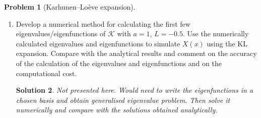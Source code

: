 \documentclass[11pt,a4paper]{article}
\theoremstyle{definition}
\newtheorem{problem}{Problem}
\theoremstyle{plain}
\newtheorem*{solution}{Solution}
\begin{document}
\begin{problem}[Karhunen--Loève expansion]
\begin{enumerate}
\begin{solution}
It can be shown that equation~\eqref{eq:final} with boundary conditions \eqref{bc-1}--\eqref{bc-2} only has solutions when $\omega^2\geq 0$ and that these are of the form
\[
\Phi(x) = c_1\cos(\omega x) + c_2\sin(\omega x).
\]
In order to compute the eigenvalues, we use the boundary conditions and obtain
\begin{align*}
c_1( a - \omega\tan(\omega L)) + c_2(\omega +  a\tan(\omega L)) &= 0, \\
c_1( a - \omega\tan(\omega L)) - c_2(\omega +  a\tan(\omega L)) &= 0.
\end{align*}
This system has nontrivial solutions only if its determinant is zero, which gives the following:
\begin{align*}
( a - \omega\tan(\omega L))  &= 0, \\
(\omega +  a\tan(\omega L)) &= 0.
\end{align*}
Denoting the solutions to these equations by $\omega, \, \omega^*$, we obtain the eigenvalues and eigenfunctions:
\begin{align}
\Phi_n(x) = \frac{\cos(\omega_n x)}{\sqrt{L+\frac{\sin(2\omega_n L)}{2\omega_n}}}, & \qquad\qquad \lambda_n = \frac{2a}{\omega_n^2+a^2}, & n \text{ even},\\
\Phi_n^*(x) = \frac{\sin(\omega_n^* x)}{\sqrt{L-\frac{\sin(2\omega_n^* L)}{2\omega_n^*}}}, & \qquad\qquad \lambda_n^* = \frac{2a}{{\omega_n^*}^2+a^2}, & n \text{ odd}.\\
\end{align}
And we can write
\[
X(t,\omega) = \sum_{n=1}^\infty \left[\xi_n\sqrt{\lambda_n}\Phi_n(x) + \xi_n^*\sqrt{\lambda_n^*}\Phi_n^*(x)\right],
\]
where $\xi_n, \, \xi_n^*$ are computed by taking the inner product of $X$ with the eigenfunctions.
\end{solution}
\item Develop a numerical method for calculating the first few eigenvalues/eigenfunctions of $\mathcal{K}$ with  $a=1, \, L=-0.5$. Use the numerically calculated eigenvalues and eigenfunctions to simulate $X(x)$ using the KL expansion. Compare with the analytical results and comment on the accuracy of the calculation of the eigenvalues and eigenfunctions and on the computational cost.

\begin{solution}
Not presented here. Would need to write the eigenfunctions in a chosen basis and obtain generalised eigenvalue problem. Then solve it numerically and compare with the solutions obtained analytically.
\end{solution}

\end{enumerate}
\end{problem}
\end{document}
